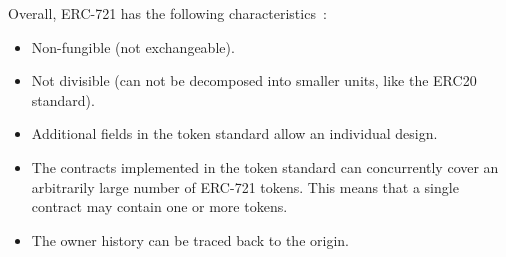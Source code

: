 Overall, ERC-721 has the following characteristics~\cite{ERC721}:

\begin{itemize}
    \item Non-fungible (not exchangeable).
    \item Not divisible (can not be decomposed into smaller units, like the ERC20 standard).
    \item Additional fields in the token standard allow an individual design.
    \item The contracts implemented in the token standard can concurrently cover an arbitrarily large number of ERC-721 tokens. This means that a single contract may contain one or more tokens.
    \item The owner history can be traced back to the origin.
  \end{itemize}
